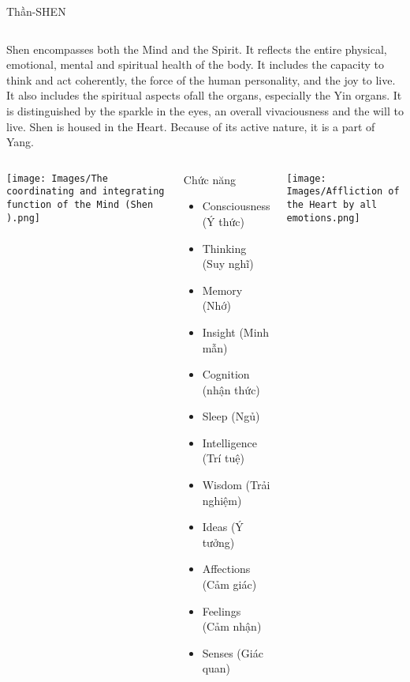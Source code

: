 \documentclass[
	11pt, %
]{beamer}
\theoremstyle{newblock}
\begin{document}
\begin{frame}{Thần-SHEN}{}
	\begin{columns}[t]
		Shen encompasses both the Mind and the Spirit. It reflects the entire physical, emotional, mental and spiritual health of the body. It includes the capacity to think and act coherently, the force of the human personality, and the joy to live. It also includes the spiritual aspects ofall the organs, especially the Yin organs. It is distinguished by the sparkle in the eyes, an overall vivaciousness and the will to live. Shen is housed in the Heart. Because of its active nature, it is a part of Yang.

	\end{columns}
\end{frame}
\begin{frame}[plain]
	\begin{columns}[T]
		\begin{center}
			\texttt{[image: Images/The coordinating and integrating function of the Mind (Shen ).png]}
		\end{center}
		\begin{block}{Chức năng}
			\begin{itemize}
				\item Consciousness (Ý thức)
				\item Thinking (Suy nghĩ)
				\item Memory (Nhớ)
				\item Insight (Minh mẫn)
				\item Cognition (nhận thức)
				\item Sleep (Ngủ)
				\item Intelligence (Trí tuệ)
				\item Wisdom (Trải nghiệm)
				\item Ideas (Ý tưởng)
				\item Affections (Cảm giác)
				\item Feelings (Cảm nhận)
				\item Senses (Giác quan)
			\end{itemize}
		\end{block}
		\begin{center}
			\texttt{[image: Images/Affliction of the Heart by all emotions.png]}
		\end{center}
	\end{columns}
\end{frame}
\end{document}
